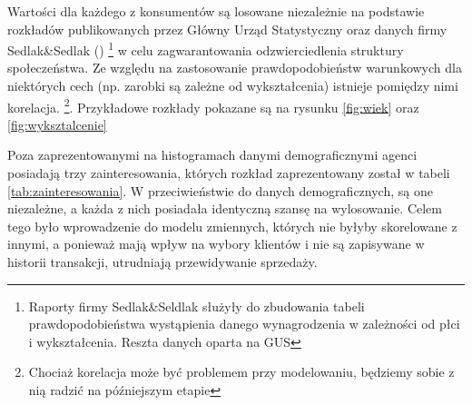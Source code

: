 \documentclass[polish, twoside, 12pt, a4paper]{article}
\theoremstyle{definition}
\theoremstyle{plain}
\theoremstyle{remark}
\begin{document}
Wartości dla każdego z konsumentów są losowane niezależnie na podstawie rozkładów publikowanych przez Główny Urząd Statystyczny \cite{GUS2011} oraz danych firmy Sedlak\&Sedlak (\cite{Sedlak2013}) \footnote{Raporty firmy Sedlak\&Seldlak służyły do zbudowania tabeli prawdopodobieństwa wystąpienia danego wynagrodzenia w zależności od płci i wykształcenia. Reszta danych oparta na GUS} w celu zagwarantowania odzwierciedlenia struktury społeczeństwa. Ze względu na zastosowanie prawdopodobieństw warunkowych dla niektórych cech (np. zarobki są zależne od wykształcenia) istnieje pomiędzy nimi korelacja. \footnote{Chociaż korelacja może być problemem przy modelowaniu, będziemy sobie z nią radzić na późniejszym etapie}. Przykładowe rozkłady pokazane są na rysunku \ref{fig:wiek} oraz \ref{fig:wyksztalcenie}

Poza zaprezentowanymi na histogramach danymi demograficznymi agenci posiadają trzy zainteresowania, których rozkład zaprezentowany został w tabeli \ref{tab:zainteresowania}. W przeciwieństwie do danych demograficznych, są one niezależne, a każda z nich posiadała identyczną szansę na wylosowanie. Celem tego było wprowadzenie do modelu zmiennych, których nie byłyby skorelowane z innymi, a ponieważ mają wpływ na wybory klientów i nie są zapisywane w historii transakcji, utrudniają przewidywanie sprzedaży.
\end{document}
